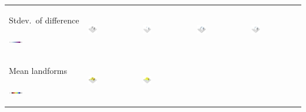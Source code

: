 \documentclass[prodmode,acmtochi]{acmsmall} %
\begin{document}
\begin{table}
{\begin{tabular}{m{} m{} m{} m{} m{}}
%
Stdev.~of difference \par \vspace{0.5em} \includegraphics[width=0.19\textwidth]{images/legends/stdev_diff_legend.pdf} & 
\includegraphics[width=0.19\textwidth]{images/render_3d/3d_experts/dem_difference_1.png} &
\includegraphics[width=0.19\textwidth]{images/render_3d/3d_experts/stdev_regression_difference_series_1.png} &
\includegraphics[width=0.19\textwidth]{images/render_3d/3d_experts/stdev_regression_difference_series_2.png} &
\includegraphics[width=0.19\textwidth]{images/render_3d/3d_experts/stdev_regression_difference_series_3.png}\\
%
Mean landforms \par \vspace{0.5em} \includegraphics[width=0.19\textwidth]{images/legends/forms_legend.pdf} & 
\includegraphics[width=0.19\textwidth]{images/render_3d/3d_experts/forms_1.png} &
\includegraphics[width=0.19\textwidth]{images/render_3d/3d_experts/mean_forms_1.png} &

\end{tabular}}
\end{table}
\end{document}
